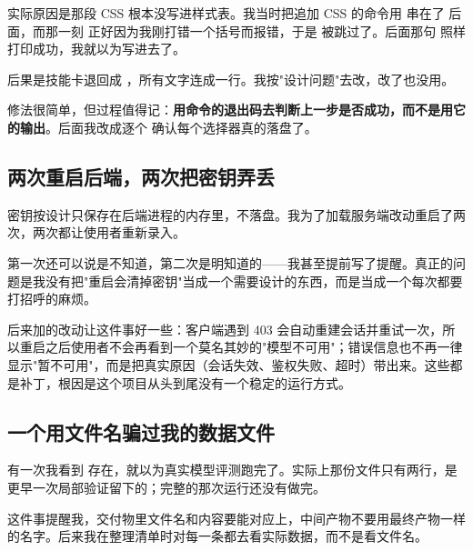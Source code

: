 实际原因是那段 CSS 根本没写进样式表。我当时把追加 CSS 的命令用 \code{\&\&} 串在了  后面，而那一刻  正好因为我刚打错一个括号而报错，于是  被跳过了。后面那句  照样打印成功，我就以为写进去了。

后果是技能卡退回成 ，所有文字连成一行。我按"设计问题"去改，改了也没用。

修法很简单，但过程值得记：\textbf{用命令的退出码去判断上一步是否成功，而不是用它的输出}。后面我改成逐个  确认每个选择器真的落盘了。

\subsection{两次重启后端，两次把密钥弄丢}

密钥按设计只保存在后端进程的内存里，不落盘。我为了加载服务端改动重启了两次，两次都让使用者重新录入。

第一次还可以说是不知道，第二次是明知道的——我甚至提前写了提醒。真正的问题是我没有把"重启会清掉密钥"当成一个需要设计的东西，而是当成一个每次都要打招呼的麻烦。

后来加的改动让这件事好一些：客户端遇到 403 会自动重建会话并重试一次，所以重启之后使用者不会再看到一个莫名其妙的"模型不可用"；错误信息也不再一律显示"暂不可用"，而是把真实原因（会话失效、鉴权失败、超时）带出来。这些都是补丁，根因是这个项目从头到尾没有一个稳定的运行方式。

\subsection{一个用文件名骗过我的数据文件}

有一次我看到  存在，就以为真实模型评测跑完了。实际上那份文件只有两行，是更早一次局部验证留下的；完整的那次运行还没有做完。

这件事提醒我，交付物里文件名和内容要能对应上，中间产物不要用最终产物一样的名字。后来我在整理清单时对每一条都去看实际数据，而不是看文件名。
